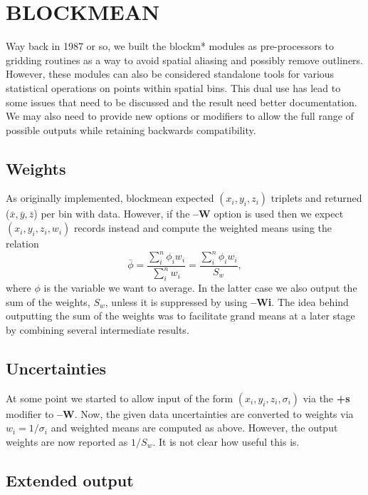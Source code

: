 \documentclass[12pt,letterpaper,margin=0.5in]{report}
\begin{document}
\section*{BLOCKMEAN}

Way back in 1987 or so, we built the blockm* modules as pre-processors to gridding routines as a way to avoid spatial aliasing
and possibly remove outliners.  However, these modules can also be considered standalone tools for various
statistical operations on points within spatial bins.  This dual use has lead to some issues that need to
be discussed and the result need better documentation.  We may also need to provide new options or modifiers
to allow the full range of possible outputs while retaining backwards compatibility.

\subsection*{Weights}
As originally implemented, blockmean expected $(x_i,y_i,z_i)$ triplets and returned ($\bar{x}, \bar{y}, \bar{z}$)
per bin with data.
However, if the {\bf --W} option is used then we expect $(x_i,y_i,z_i,w_i)$ records instead and compute the weighted means
using the relation
\begin{equation}
	\bar{\phi} = \frac{\sum_i^n \phi_i w_i}{\sum_i^n w_i} = \frac{\sum_i^n \phi_i w_i}{S_w},
\end{equation}
where $\phi$ is the variable we want to average.
In the latter case we also output the sum of the weights, $S_w$, unless it is suppressed by using {\bf--Wi}.  The idea
behind outputting the sum of the weights was to facilitate grand means at a later stage by combining several
intermediate results.

\subsection*{Uncertainties}

At some point we started to allow input of the form  $(x_i,y_i,z_i,\sigma_i)$ via the {\bf +s} modifier to {\bf--W}. Now,
the given data uncertainties are converted to weights via $w_i = 1/\sigma_i$ and weighted means are computed
as above.  However, the output weights are now reported as $1/S_w$.  It is not clear how useful this is.

\subsection*{Extended output}
\end{document}
